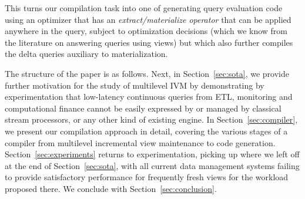 {This turns our compilation task into one of generating query evaluation code using an optimizer that has an {\em extract/materialize operator} that can be applied anywhere in the query, subject to optimization decisions (which we know from the literature on answering queries using views) but which also further compiles the delta queries auxiliary to materialization.


\medskip

The structure of the paper is as follows. Next, in Section~\ref{sec:sota}, we provide further motivation for the study of multilevel IVM by demonstrating by experimentation that low-latency continuous queries from ETL, monitoring and computational finance cannot be easily expressed by or managed by classical stream processors, or any other kind of existing engine. 
In Section~\ref{sec:compiler}, we present our compilation approach in detail, covering the various stages of a compiler from multilevel
incremental view maintenance to code generation.
Section~\ref{sec:experiments} returns to experimentation, picking up where we left off at the end of Section~\ref{sec:sota}, with all current data management systems failing to provide satisfactory performance for frequently fresh views for the workload proposed there.
We conclude with Section~\ref{sec:conclusion}.
} %

